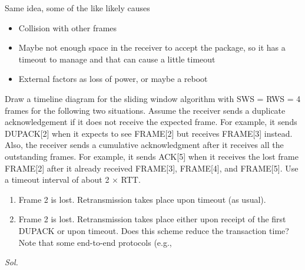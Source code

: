 \documentclass{assignment}
\begin{document}
\begin{enumerate}
  Same idea, some of the like likely causes
  \begin{itemize}
    \item Collision with other frames
    \item Maybe not enough space in the receiver to accept the package, so it
      has a timeout to manage and that can cause a little timeout
    \item External factors as loss of power, or maybe a reboot
  \end{itemize}
\end{enumerate} 
\newpage
\begin{ex}
Draw a timeline diagram for the sliding window algorithm with SWS = RWS = 4 frames for the 
following two situations. Assume the receiver sends a duplicate acknowledgement if it does not receive 
the expected frame. For example, it sends DUPACK[2] when it expects to see FRAME[2] but receives 
FRAME[3] instead. Also, the receiver sends a cumulative acknowledgment after it receives all the 
outstanding frames. For example, it sends ACK[5] when it receives the lost frame FRAME[2] after it 
already received FRAME[3], FRAME[4], and FRAME[5]. Use a timeout interval of about 2 × RTT.
\begin{enumerate}
  \item Frame 2 is lost. Retransmission takes place upon timeout (as usual).
  \item Frame 2 is lost. Retransmission takes place either upon receipt of the first DUPACK or upon 
timeout. Does this scheme reduce the transaction time? Note that some end-to-end protocols (e.g., 
\end{enumerate}
\end{ex}
\textit{ Sol. }
\end{document}
